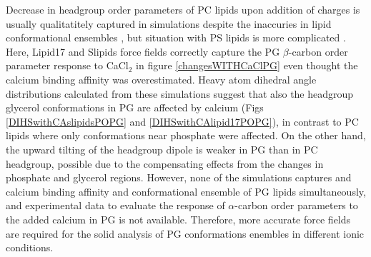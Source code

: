 \documentclass[aps,prl,superscriptaddress,twocolumn]{revtex4}
\begin{document}

Decrease in headgroup order parameters of PC lipids upon addition of charges is
usually qualitatitely captured in simulations despite the inaccuries in lipid conformational ensembles \cite{catte16},
but situation with PS lipids is more complicated \cite{antila19,meclr20}.
Here, Lipid17 and Slipids force fields correctly capture the PG $\beta$-carbon order parameter response to CaCl$_2$
in figure \ref{changesWITHCaClPG} even thought the calcium binding affinity was overestimated.
Heavy atom dihedral angle distributions calculated from these simulations
suggest that also the headgroup glycerol conformations in PG are affected by calcium
(Figs \ref{DIHSwithCAslipidsPOPG} and \ref{DIHSwithCAlipid17POPG}),
in contrast to PC lipids where only conformations near phosphate were affected.
On the other hand, the upward tilting of the headgroup dipole is weaker
in PG than in PC headgroup, possible due to the compensating effects from the changes in
phosphate and glycerol regions. 
However, none of the simulations captures and calcium binding affinity and conformational ensemble of PG lipids
simultaneously, and experimental data to evaluate 
the response of $\alpha$-carbon order parameters to
the added calcium in PG is not available.
Therefore, more accurate force fields are required for the solid analysis of PG conformations enembles in different ionic conditions.
\end{document}
